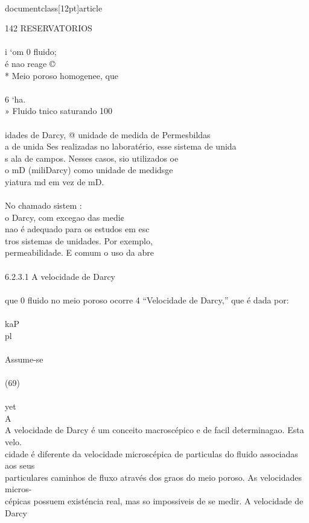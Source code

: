 \\documentclass[12pt]{article}
\begin{document}
142 RESERVATORIOS\\
\\
i ‘om 0 fluido;\\
é nao reage ©\\
* Meio poroso homogenee, que\\
\\
6 ‘ha.\\
» Fluido tnico saturando 100\\%
\\
idades de Darcy, @ unidade de medida de Permesbildas\\
a de unida Ses realizadas no laboratério, esse sistema de unida\\
s ala de campos. Nesses casos, sio utilizados oe\\
o mD (miliDarcy) como unidade de medidsge\\
yiatura md em vez de mD.\\
\\
No chamado sistem :\\
o Darcy, com excegao das medi¢\\
nao é adequado para os estudos em esc\\
tros sistemas de unidades. Por exemplo,\\
permeabilidade. E comum o uso da abre\\
\\
6.2.3.1 A velocidade de Darcy\\
\\
que 0 fluido no meio poroso ocorre 4 “Velocidade de Darcy,” que é dada por:\\
\\
kaP\\
pl\\
\\
Assume-se\\
\\
(69)\\
\\
yet\\
A\\
A velocidade de Darcy é um conceito macroscépico e de facil determinagao. Esta velo.\\
cidade é diferente da velocidade microscépica de particulas do fluido associadas aos seus\\
particulares caminhos de fluxo através dos graos do meio poroso. As velocidades micros-\\
cépicas possuem existéncia real, mas so impossiveis de se medir. A velocidade de Darcy\\
\end{document}
